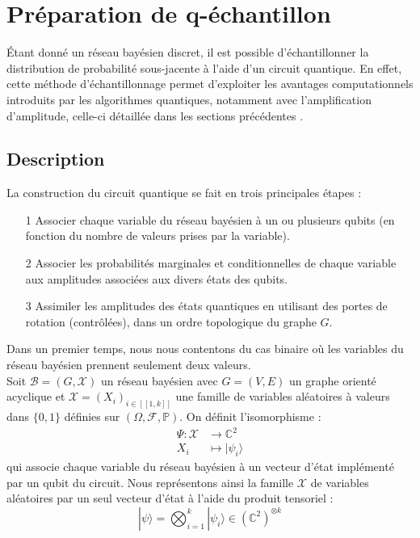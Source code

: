 \section{Préparation de q-échantillon}

Étant donné un réseau bayésien discret, il est possible d'échantillonner la distribution de probabilité sous-jacente à l'aide d'un circuit quantique. En effet, cette méthode d'échantillonnage permet d'exploiter les avantages computationnels introduits par les algorithmes quantiques, notamment avec l'amplification d'amplitude, celle-ci détaillée dans les sections précédentes \cite{borujeni2021quantum}.

\subsection{Description}
La construction du circuit quantique se fait en trois principales étapes :
\begin{itemize}
\item[1] Associer chaque variable du réseau bayésien à un ou plusieurs qubits (en fonction du nombre de valeurs prises par la variable).
\item[2] Associer les probabilités marginales et conditionnelles de chaque variable aux amplitudes associées aux divers états des qubits.
\item[3] Assimiler les amplitudes des états quantiques en utilisant des portes de rotation (contrôlées), dans un ordre topologique du graphe $G$.
\end{itemize}
Dans un premier temps, nous nous contentons du cas binaire où les variables du réseau bayésien prennent seulement deux valeurs.
\\
Soit  $\mathcal{B} = (G,\mathcal{X})$ un réseau bayésien avec $G=(V,E)$ un graphe orienté acyclique et $\mathcal{X}=(X_i)_{i\in[\![1,k]\!]}$ une famille de variables aléatoires à valeurs dans $\{0,1\}$ définies sur $(\Omega, \mathcal{F}, \mathbb{P})$. On définit l'isomorphisme :
\begin{align*}
    \Psi : \mathcal{X} &\longrightarrow \mathbb{C}^2\\
    X_i &\longmapsto |\psi_i\rangle
\end{align*}
qui associe chaque variable du réseau bayésien à un vecteur d'état implémenté par un qubit du circuit. Nous représentons ainsi la famille $\mathcal{X}$ de variables aléatoires par un seul vecteur d'état à l'aide du produit tensoriel :
\[|\psi\rangle = \bigotimes_{i=1}^{k}|\psi_i\rangle \in (\mathbb{C}^2)^{\otimes k}\]
